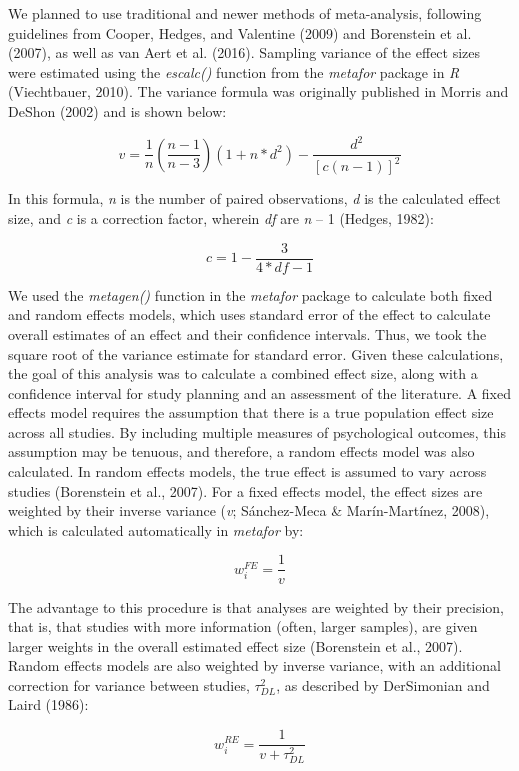 \documentclass[,man]{apa6}
\begin{document}
We planned to use traditional and newer methods of meta-analysis, following guidelines from Cooper, Hedges, and Valentine (2009) and Borenstein et al. (2007), as well as van Aert et al. (2016). Sampling variance of the effect sizes were estimated using the \emph{escalc()} function from the \emph{metafor} package in \emph{R} (Viechtbauer, 2010). The variance formula was originally published in Morris and DeShon (2002) and is shown below:

\[
v = \frac { 1 } { n } (\frac { n - 1 } { n - 3 } )(1 + n*d^2) - \frac { d^2 } { [c(n-1)]^2}
\]

In this formula, \emph{n} is the number of paired observations, \emph{d} is the calculated effect size, and \emph{c} is a correction factor, wherein \emph{df} are \emph{n} -- 1 (Hedges, 1982):

\[
c = 1 - \frac { 3 } { 4*df - 1 }
\]

We used the \emph{metagen()} function in the \emph{metafor} package to calculate both fixed and random effects models, which uses standard error of the effect to calculate overall estimates of an effect and their confidence intervals. Thus, we took the square root of the variance estimate for standard error. Given these calculations, the goal of this analysis was to calculate a combined effect size, along with a confidence interval for study planning and an assessment of the literature. A fixed effects model requires the assumption that there is a true population effect size across all studies. By including multiple measures of psychological outcomes, this assumption may be tenuous, and therefore, a random effects model was also calculated. In random effects models, the true effect is assumed to vary across studies (Borenstein et al., 2007). For a fixed effects model, the effect sizes are weighted by their inverse variance (\emph{v}; Sánchez-Meca \& Marín-Martínez, 2008), which is calculated automatically in \emph{metafor} by:

\[
w_{i}^{FE} = \frac {1} {v}
\]

The advantage to this procedure is that analyses are weighted by their precision, that is, that studies with more information (often, larger samples), are given larger weights in the overall estimated effect size (Borenstein et al., 2007). Random effects models are also weighted by inverse variance, with an additional correction for variance between studies, \(\tau^2_{DL}\), as described by DerSimonian and Laird (1986):

\[
w_{i}^{RE} = \frac {1} {v + \tau^2_{DL}}
\]
\end{document}
